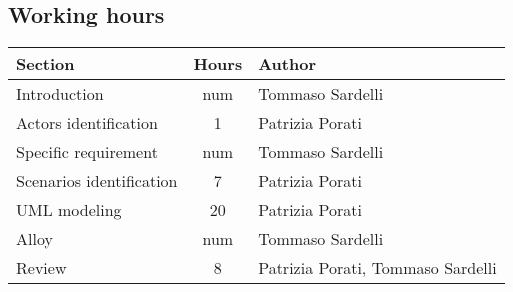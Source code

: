 \subsection{Working hours}

\begin{center}
	\vspace{0.2cm}
	\begin{tabular}{ l c l } 
		\hline
		Section 					& Hours & Author \\ 
		\hline
		Introduction				& num	& Tommaso Sardelli	\\
		Actors identification		& 1		& Patrizia Porati 	\\
		Specific requirement 		& num 	& Tommaso Sardelli 	\\ 
		Scenarios identification	& 7 	& Patrizia Porati	\\
		UML modeling				& 20	& Patrizia Porati	\\
		Alloy						& num	& Tommaso Sardelli 	\\
		Review						& 8		& Patrizia Porati, Tommaso Sardelli	\\
		\hline
	\end{tabular}
\end{center}